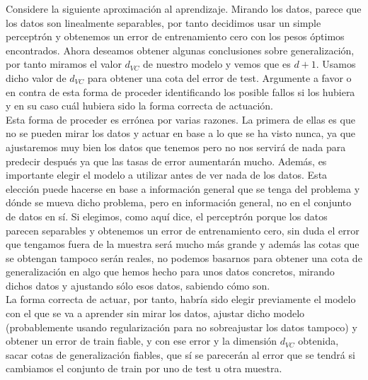 \documentclass[12pt]{article}
\theoremstyle{definition}
\begin{document}
\begin{pregunta}
Considere la siguiente aproximación al aprendizaje. Mirando los datos, parece que los datos son linealmente separables, por tanto decidimos usar un simple perceptrón y obtenemos un error de entrenamiento cero con los pesos óptimos encontrados. Ahora deseamos obtener algunas conclusiones sobre generalización, por tanto miramos el valor $d_{VC}$ de nuestro modelo y vemos que es $d + 1$. Usamos dicho valor de $d_{VC}$ para obtener una cota del error de test. Argumente a favor o en contra de esta forma de proceder identificando los posible fallos si los hubiera y en su caso cuál hubiera sido la forma correcta de actuación.\\

Esta forma de proceder es errónea por varias razones. La primera de ellas es que no se pueden mirar los datos y actuar en base a lo que se ha visto nunca, ya que ajustaremos muy bien los datos que tenemos pero no nos servirá de nada para predecir después ya que las tasas de error aumentarán mucho. Además, es importante elegir el modelo a utilizar antes de ver nada de los datos. Esta elección puede hacerse en base a información general que se tenga del problema y dónde se mueva dicho problema, pero en información general, no en el conjunto de datos en sí. Si elegimos, como aquí dice, el perceptrón porque los datos parecen separables y obtenemos un error de entrenamiento cero, sin duda el error que tengamos fuera de la muestra será mucho más grande y además las cotas que se obtengan tampoco serán reales, no podemos basarnos para obtener una cota de generalización en algo que hemos hecho para unos datos concretos, mirando dichos datos y ajustando sólo esos datos, sabiendo cómo son.\\
La forma correcta de actuar, por tanto, habría sido elegir previamente el modelo con el que se va a aprender sin mirar los datos, ajustar dicho modelo (probablemente usando regularización para no sobreajustar los datos tampoco) y obtener un error de train fiable, y con ese error y la dimensión $d_{VC}$ obtenida, sacar cotas de generalización fiables, que sí se parecerán al error que se tendrá si cambiamos el conjunto de train por uno de test u otra muestra.
\end{pregunta}
\end{document}
